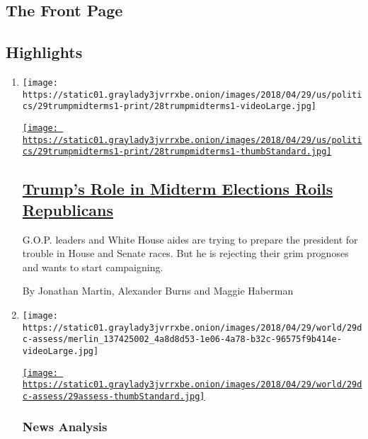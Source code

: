 \hypertarget{the-front-page}{%
\subsection{The Front Page}\label{the-front-page}}

\hypertarget{highlights}{%
\subsection{Highlights}\label{highlights}}

\begin{enumerate}
\def\labelenumi{\arabic{enumi}.}
\item
  \texttt{[image: https://static01.graylady3jvrrxbe.onion/images/2018/04/29/us/politics/29trumpmidterms1-print/28trumpmidterms1-videoLarge.jpg]}

  \href{/2018/04/28/us/politics/trump-midterm-elections.html}{\texttt{[image: https://static01.graylady3jvrrxbe.onion/images/2018/04/29/us/politics/29trumpmidterms1-print/28trumpmidterms1-thumbStandard.jpg]}}

  \hypertarget{trumps-role-in-midterm-elections-roils-republicans}{%
  \subsection{\texorpdfstring{\href{/2018/04/28/us/politics/trump-midterm-elections.html}{Trump's
  Role in Midterm Elections Roils
  Republicans}}{Trump's Role in Midterm Elections Roils Republicans}}\label{trumps-role-in-midterm-elections-roils-republicans}}

  G.O.P. leaders and White House aides are trying to prepare the
  president for trouble in House and Senate races. But he is rejecting
  their grim prognoses and wants to start campaigning.

  By Jonathan Martin, Alexander Burns and Maggie Haberman
\item
  \texttt{[image: https://static01.graylady3jvrrxbe.onion/images/2018/04/29/world/29dc-assess/merlin\_137425002\_4a8d8d53-1e06-4a78-b32c-96575f9b414e-videoLarge.jpg]}

  \href{/2018/04/28/us/politics/trump-north-korea.html}{\texttt{[image: https://static01.graylady3jvrrxbe.onion/images/2018/04/29/world/29dc-assess/29assess-thumbStandard.jpg]}}

  \hypertarget{news-analysis}{%
  \subsubsection{News Analysis}\label{news-analysis}}


\end{enumerate}
